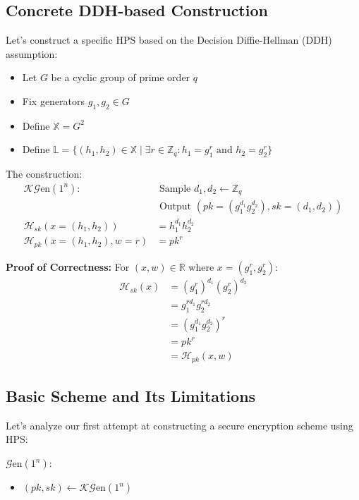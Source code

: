 \subsection{Concrete DDH-based Construction}

Let's construct a specific HPS based on the Decision Diffie-Hellman (DDH) assumption:

\begin{itemize}
    \item Let $G$ be a cyclic group of prime order $q$
    \item Fix generators $g_1, g_2 \in G$
    \item Define $\mathbb{X} = G^2$
    \item Define $\mathbb{L} = \{(h_1,h_2) \in \mathbb{X} \mid \exists r \in \mathbb{Z}_q: h_1=g_1^r \text{ and } h_2=g_2^r\}$
\end{itemize}

The construction:
\begin{align*}
    \mathcal{K}\mathcal{G}\text{en}(1^n): &\text{ Sample } d_1,d_2 \gets \mathbb{Z}_q \\
    &\text{ Output } (pk=(g_1^{d_1}g_2^{d_2}), sk=(d_1,d_2)) \\
    \mathcal{H}_{sk}(x=(h_1,h_2)) &= h_1^{d_1}h_2^{d_2} \\
    \mathcal{H}_{pk}(x=(h_1,h_2),w=r) &= pk^r
\end{align*}

\textbf{Proof of Correctness:}
For $(x,w) \in \mathbb{R}$ where $x=(g_1^r, g_2^r)$:
\begin{align*}
    \mathcal{H}_{sk}(x) &= (g_1^r)^{d_1}(g_2^r)^{d_2} \\
    &= g_1^{rd_1}g_2^{rd_2} \\
    &= (g_1^{d_1}g_2^{d_2})^r \\
    &= pk^r \\
    &= \mathcal{H}_{pk}(x,w)
\end{align*}

\subsection{Basic Scheme and Its Limitations}

Let's analyze our first attempt at constructing a secure encryption scheme using HPS:

$\mathcal{G}\text{en}(1^n)$:
\begin{itemize}
    \item $(pk,sk) \leftarrow \mathcal{K}\mathcal{G}\text{en}(1^n)$
\end{itemize}

